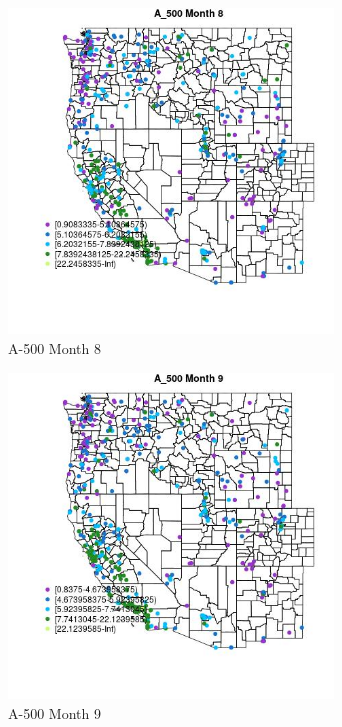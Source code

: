\begin{figure} 
\centering  
\includegraphics[width=0.77\textwidth]{Code_Outputs/ML_input_report_ML_input_PM25_Step5_part_d_de_duplicated_aves_ML_input_MapObsMo8A_500.jpg} 
\caption{\label{fig:ML_input_report_ML_input_PM25_Step5_part_d_de_duplicated_aves_ML_inputMapObsMo8A_500}A-500 Month 8} 
\end{figure} 
 

\begin{figure} 
\centering  
\includegraphics[width=0.77\textwidth]{Code_Outputs/ML_input_report_ML_input_PM25_Step5_part_d_de_duplicated_aves_ML_input_MapObsMo9A_500.jpg} 
\caption{\label{fig:ML_input_report_ML_input_PM25_Step5_part_d_de_duplicated_aves_ML_inputMapObsMo9A_500}A-500 Month 9} 
\end{figure} 
 

